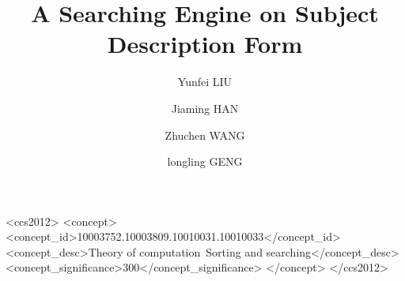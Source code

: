 \documentclass[manuscript,screen,review,12pt]{acmart}
\begin{document}
\title{A Searching Engine on Subject Description Form}

\author{Yunfei LIU}
\author{Jiaming HAN}
\authornotemark[1]


\author{Zhuchen WANG}
\authornotemark[1]



\author{longling GENG}
\authornotemark[1]


\renewcommand{\shortauthors}{Yunfei et al.}
\newcommand{\tabincell}[2]{\begin{tabular}{@{}#1@{}}#2\end{tabular}}


\begin{CCSXML}
<ccs2012>
   <concept>
       <concept_id>10003752.10003809.10010031.10010033</concept_id>
       <concept_desc>Theory of computation~Sorting and searching</concept_desc>
       <concept_significance>300</concept_significance>
       </concept>
 </ccs2012>
\end{CCSXML}

\end{document}
